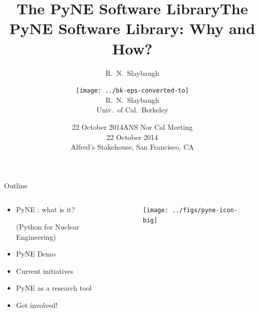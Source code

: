 \documentclass[xcolor=x11names,compress]{beamer}
\title{The PyNE Software Library}
\author{R.\ N.\ Slaybaugh}
\date{22 October 2014}
\renewcommand{\(}{\begin{columns}}
\renewcommand{\)}{\end{columns}}
\newcommand{\<}[1]{\begin{column}{#1}}
\renewcommand{\>}{\end{column}}
\begin{document}
\begin{frame}
\title{The PyNE Software Library: Why and How?}
\author{
        \texttt{[image: ../bk-eps-converted-to]}\\R.\ N.\ Slaybaugh \\ Univ.\ of Cal.\ Berkeley}

\date{ANS Nor Cal Meeting \\ 22 October 2014\\ Alfred's Stakehouse, San Francisco, CA}
\titlepage
\end{frame}

\begin{frame}{Outline}

	\begin{columns}
  	\begin{column}{0.5\textwidth}
	    \begin{itemize}
        \item PyNE \cite{pyne}: what is it?
        
        (Python for Nuclear Engineering)
        \item PyNE Demo
        \item Current initiatives
        \item PyNE as a research tool
        \item Get involved!
	    \end{itemize}
  	\end{column}
 	\begin{column}{0.4\textwidth}
 	   \begin{center}
 	   \begin{figure}
       \texttt{[image: ../figs/pyne-icon-big]}
	   \end{figure}
 	   \end{center}
  	\end{column}
	\end{columns}

\end{frame}

\end{document}
